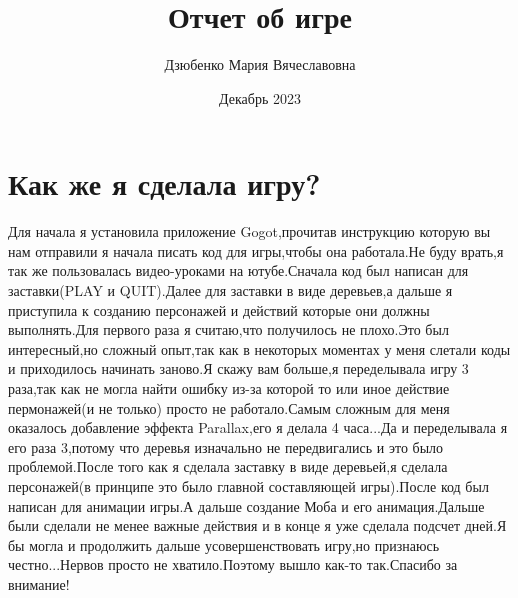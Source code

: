 \documentclass[a4paper,12pt]{article}
\title{Отчет об игре}
\author{Дзюбенко Мария Вячеславовна }
\date{Декабрь 2023}
\begin{document}
\maketitle

\section{Как же я сделала игру?}
Для начала я установила приложение Gogot,прочитав инструкцию которую вы нам отправили я начала писать код для игры,чтобы она работала.Не буду врать,я так же пользовалась видео-уроками на ютубе.Сначала код был написан для заставки(PLAY и QUIT).Далее для заставки в виде деревьев,а дальше я приступила к созданию персонажей и действий которые они должны выполнять.Для первого раза я считаю,что получилось не плохо.Это был интересный,но сложный опыт,так как в некоторых моментах у меня слетали коды и приходилось начинать заново.Я скажу вам больше,я переделывала игру 3 раза,так как не могла найти ошибку из-за которой то или иное действие пермонажей(и не только) просто не работало.Самым сложным для меня оказалось добавление эффекта Parallax,его я делала 4 часа...Да и переделывала я его раза 3,потому что деревья изначально не передвигались и это было проблемой.После того как я сделала заставку в виде деревьей,я сделала персонажей(в принципе это было главной составляющей игры).После код был написан для анимации игры.А дальше создание Моба и его анимация.Дальше были сделали не менее важные действия и в конце я уже сделала подсчет дней.Я бы могла и продолжить дальше усовершенствовать игру,но признаюсь честно...Нервов просто не хватило.Поэтому вышло как-то так.Спасибо за внимание!
\end{document}
